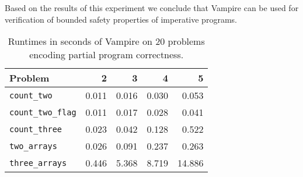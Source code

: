 Based on the results of this experiment we conclude that Vampire can be used for verification of bounded safety properties of imperative programs.


\begin{table}[ht]
  \caption{Runtimes in seconds of Vampire on 20 problems encoding partial program correctness.}
  \begin{center}
  \begin{tabular}{lrrrr}
    \hline Problem & 2 & 3 & 4 & 5 \\ \hline
    \verb'count_two'        &  0.011  &  0.016  &  0.030  &  0.053 \\
    \verb'count_two_flag'   &  0.011  &  0.017  &  0.028  &  0.041 \\
    \verb'count_three'      &  0.023  &  0.042  &  0.128  &  0.522 \\
    \verb'two_arrays'       &  0.026  &  0.091  &  0.237  &  0.263 \\
    \verb'three_arrays'     &  0.446  &  5.368  &  8.719  & 14.886
  \end{tabular}
  \end{center}
  \label{table:examples-results}
  \vspace{-1em}
\end{table}
